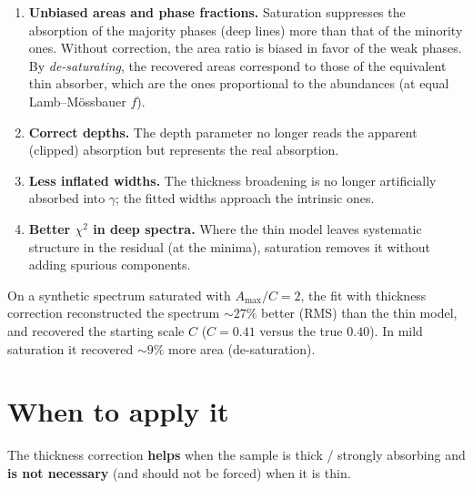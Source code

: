\begin{enumerate}[leftmargin=*]
  \item \textbf{Unbiased areas and phase fractions.} Saturation suppresses
        the absorption of the majority phases (deep lines) more than that of the
        minority ones. Without correction, the area ratio is biased in favor of
        the weak phases. By \emph{de-saturating}, the recovered areas
        correspond to those of the equivalent thin absorber, which are the ones
        proportional to the abundances (at equal Lamb–Mössbauer $f$).
  \item \textbf{Correct depths.} The depth parameter no longer reads
        the apparent (clipped) absorption but represents the real absorption.
  \item \textbf{Less inflated widths.} The thickness broadening is no longer
        artificially absorbed into $\gamma$; the fitted widths approach the
        intrinsic ones.
  \item \textbf{Better $\chi^2$ in deep spectra.} Where the thin model
        leaves systematic structure in the residual (at the minima), saturation
        removes it without adding spurious components.
\end{enumerate}

\begin{nota}[Verification]
On a synthetic spectrum saturated with $A_{\max}/C=2$, the fit with thickness
correction reconstructed the spectrum $\sim27\%$ better (RMS) than the thin
model, and recovered the starting scale $C$ ($C=0.41$ versus the true
$0.40$). In mild saturation it recovered $\sim9\%$ more area (de-saturation).
\end{nota}

\section{When to apply it}

\begin{aviso}
The thickness correction \textbf{helps} when the sample is thick / strongly
absorbing and \textbf{is not necessary} (and should not be forced) when it is thin.
\end{aviso}

